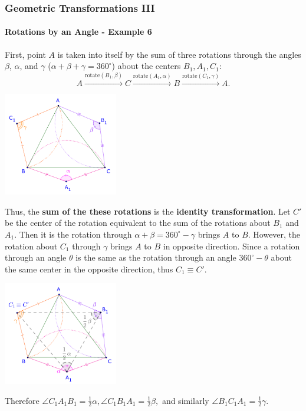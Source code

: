 \documentclass[8pt,xcolor=table,dvipsnames]{beamer}
\providecommand{\half}{\frac{1}{2}}
\newcommand{\dg}{^\circ}
\begin{document}
\begin{frame}[t]
    \frametitle{Geometric Transformations III}
    \framesubtitle{Rotations by an Angle - Example 6}
    \begin{overprint}
        First, point $A$ is taken into itself by the sum of three rotations through the angles $\beta$, $\alpha$, and $\gamma$
        ($\alpha + \beta + \gamma = 360\dg$) about the centers $B_1, A_1, C_1$:
        \[
            A \stackrel{\text{rotate}(B_1, \beta)}{\rightarrow} C \stackrel{\text{rotate}(A_1, \alpha)}{\rightarrow} B 
            \stackrel{\text{rotate}(C_1, \gamma)}{\rightarrow} A. 
        \]
        \begin{center}
            \includegraphics[width=5cm]{./svg/pdf/rotation-6b.pdf}
        \end{center}
        Thus, the \textbf{sum of the these rotations} is the \textbf{identity transformation}.
        Let $C'$ be the center of the rotation equivalent to the sum of the rotations about $B_1$ and $A_1$.
        Then it is the rotation through $\alpha + \beta = 360\dg - \gamma$ brings $A$ to $B$.
        \bigbreak
        However, the rotation about $C_1$ through $\gamma$ brings $A$ to $B$ in opposite direction.
        Since a rotation through an angle $\theta$ is the same as the rotation through an angle $360\dg - \theta$
        about the same center in the opposite direction, thus $C_1 \equiv C'.$
        \begin{center}
            \includegraphics[width=5cm]{./svg/pdf/rotation-6c.pdf}
        \end{center}
        Therefore $\angle C_1A_1B_1 = \half \alpha, \angle C_1B_1A_1 = \half \beta,$ and similarly $\angle B_1C_1A_1 = \half \gamma.$ 
    \end{overprint}
\end{frame}
\end{document}
